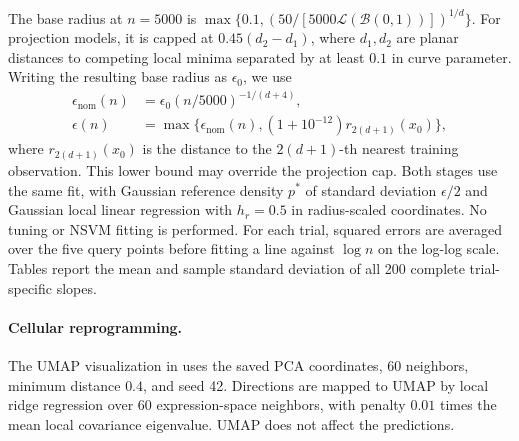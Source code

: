 \documentclass[11pt]{article}
\begin{document}
\begin{appendices}
The base radius at $n=5000$ is $\max\{0.1,(50/[5000\mathcal{L}(\mathcal{B}(0,1))])^{1/d}\}$. For projection models, it is capped at $0.45(d_2-d_1)$, where $d_1,d_2$ are planar distances to competing local minima separated by at least $0.1$ in curve parameter. Writing the resulting base radius as $\epsilon_0$, we use
\[
\begin{aligned}
    \epsilon_{\mathrm{nom}}(n)&=\epsilon_0(n/5000)^{-1/(d+4)},\\
    \epsilon(n)&=\max\{\epsilon_{\mathrm{nom}}(n),(1+10^{-12})r_{2(d+1)}(x_0)\},
\end{aligned}
\]
where $r_{2(d+1)}(x_0)$ is the distance to the $2(d+1)$-th nearest training observation. This lower bound may override the projection cap. Both stages use the same fit, with Gaussian reference density $p^*$ of standard deviation $\epsilon/2$ and Gaussian local linear regression with $h_r=0.5$ in radius-scaled coordinates. No tuning or NSVM fitting is performed. For each trial, squared errors are averaged over the five query points before fitting a line against $\log n$ on the log-log scale. Tables report the mean and sample standard deviation of all 200 complete trial-specific slopes.

\paragraph{Cellular reprogramming.} The UMAP visualization in  uses the saved PCA coordinates, 60 neighbors, minimum distance $0.4$, and seed 42. Directions are mapped to UMAP by local ridge regression over 60 expression-space neighbors, with penalty $0.01$ times the mean local covariance eigenvalue. UMAP does not affect the predictions.


\end{appendices}

\end{document}
